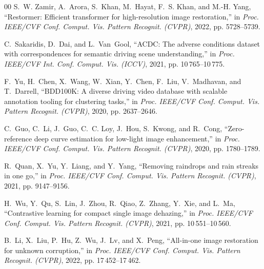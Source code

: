 \documentclass[conference]{IEEEtran}
\begin{document}
\begin{thebibliography}{00}
S.~W. Zamir, A.~Arora, S.~Khan, M.~Hayat, F.~S. Khan, and M.-H. Yang,
``Restormer: Efficient transformer for high-resolution image restoration,''
in \emph{Proc. IEEE/CVF Conf. Comput. Vis. Pattern Recognit. (CVPR)}, 2022, pp. 5728--5739.

C.~Sakaridis, D.~Dai, and L.~Van~Gool,
``ACDC: The adverse conditions dataset with correspondences for semantic driving scene understanding,''
in \emph{Proc. IEEE/CVF Int. Conf. Comput. Vis. (ICCV)}, 2021, pp. 10\,765--10\,775.

F.~Yu, H.~Chen, X.~Wang, W.~Xian, Y.~Chen, F.~Liu, V.~Madhavan, and T.~Darrell,
``BDD100K: A diverse driving video database with scalable annotation tooling for clustering tasks,''
in \emph{Proc. IEEE/CVF Conf. Comput. Vis. Pattern Recognit. (CVPR)}, 2020, pp. 2637--2646.

C.~Guo, C.~Li, J.~Guo, C.~C. Loy, J.~Hou, S.~Kwong, and R.~Cong,
``Zero-reference deep curve estimation for low-light image enhancement,''
in \emph{Proc. IEEE/CVF Conf. Comput. Vis. Pattern Recognit. (CVPR)}, 2020, pp. 1780--1789.

R.~Quan, X.~Yu, Y.~Liang, and Y.~Yang,
``Removing raindrops and rain streaks in one go,''
in \emph{Proc. IEEE/CVF Conf. Comput. Vis. Pattern Recognit. (CVPR)}, 2021, pp. 9147--9156.

H.~Wu, Y.~Qu, S.~Lin, J.~Zhou, R.~Qiao, Z.~Zhang, Y.~Xie, and L.~Ma,
``Contrastive learning for compact single image dehazing,''
in \emph{Proc. IEEE/CVF Conf. Comput. Vis. Pattern Recognit. (CVPR)}, 2021, pp. 10\,551--10\,560.

B.~Li, X.~Liu, P.~Hu, Z.~Wu, J.~Lv, and X.~Peng,
``All-in-one image restoration for unknown corruption,''
in \emph{Proc. IEEE/CVF Conf. Comput. Vis. Pattern Recognit. (CVPR)}, 2022, pp. 17\,452--17\,462.

\end{thebibliography}
\end{document}
